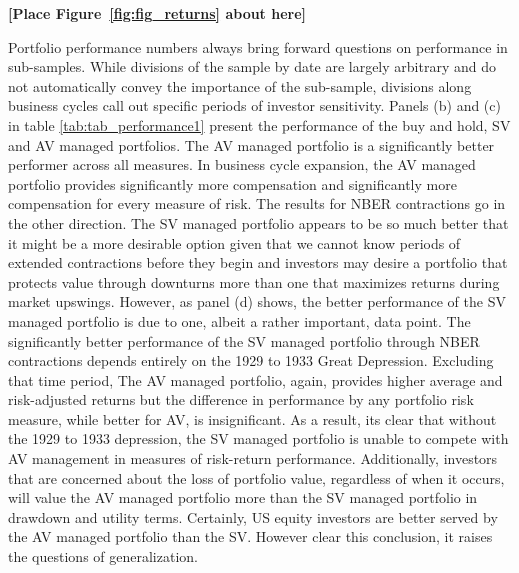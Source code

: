\bigskip
\centerline{\bf [Place Figure~\ref{fig:fig_returns} about here]}
\bigskip

Portfolio performance numbers always bring forward questions on performance in sub-samples. While divisions of the sample by date are largely arbitrary and do not automatically convey the importance of the sub-sample, divisions along business cycles call out specific periods of investor sensitivity. Panels (b) and (c) in table \ref{tab:tab_performance1} present the performance of the buy and hold, SV and AV managed portfolios. The AV managed portfolio is a significantly better performer across all measures. In business cycle expansion, the AV managed portfolio provides significantly more compensation and significantly more compensation for every measure of risk. The results for NBER contractions go in the other direction. The SV managed portfolio appears to be so much better that it might be a more desirable option given that we cannot know periods of extended contractions before they begin and investors may desire a portfolio that protects value through downturns more than one that maximizes returns during market upswings. However, as panel (d) shows, the better performance of the SV managed portfolio is due to one, albeit a rather important, data point. The significantly better performance of the SV managed portfolio through NBER contractions depends entirely on the 1929 to 1933 Great Depression. Excluding that time period, The AV managed portfolio, again, provides higher average and risk-adjusted returns but the difference in performance by any portfolio risk measure, while better for AV, is insignificant. As a result, its clear that without the 1929 to 1933 depression, the SV managed portfolio is unable to compete with AV management in measures of risk-return performance. Additionally, investors that are concerned about the loss of portfolio value, regardless of when it occurs, will value the AV managed portfolio more than the SV managed portfolio in drawdown and utility terms. Certainly, US equity investors are better served by the AV managed portfolio than the SV. However clear this conclusion, it raises the questions of generalization. 
